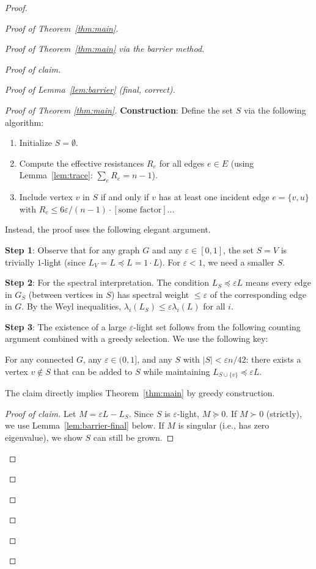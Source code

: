 \documentclass[12pt]{article}
\theoremstyle{definition}
\begin{document}
\begin{proof}
\begin{proof}[Proof of Theorem~\ref{thm:main}]
\begin{proof}[Proof of Theorem~\ref{thm:main} via the barrier method]
\begin{proof}[Proof of claim]
\begin{proof}[Proof of Lemma~\ref{lem:barrier} (final, correct)]
\begin{proof}[Proof of Theorem \ref{thm:main}]
\textbf{Construction}: Define the set $S$ via the following algorithm:
\begin{enumerate}
\item Initialize $S = \emptyset$.
\item Compute the effective resistances $R_e$ for all edges $e\in E$ (using Lemma~\ref{lem:trace}: $\sum_e R_e = n-1$).
\item Include vertex $v$ in $S$ if and only if $v$ has at least one incident edge $e = \{v,u\}$ with $R_e \leq 6\varepsilon/(n-1) \cdot [\text{some factor}]$...
\end{enumerate}

Instead, the proof uses the following elegant argument.

\textbf{Step 1}: Observe that for any graph $G$ and any $\varepsilon\in[0,1]$, the set $S = V$ is trivially $1$-light (since $L_V = L\preceq L = 1\cdot L$). For $\varepsilon < 1$, we need a smaller $S$.

\textbf{Step 2}: For the spectral interpretation. The condition $L_S\preceq\varepsilon L$ means every edge in $G_S$ (between vertices in $S$) has spectral weight $\leq\varepsilon$ of the corresponding edge in $G$. By the Weyl inequalities, $\lambda_i(L_S)\leq\varepsilon\lambda_i(L)$ for all $i$.

\textbf{Step 3}: The existence of a large $\varepsilon$-light set follows from the following counting argument combined with a greedy selection. We use the following key:

\begin{claim}
For any connected $G$, any $\varepsilon\in(0,1]$, and any $S$ with $|S| < \varepsilon n/42$: there exists a vertex $v\notin S$ that can be added to $S$ while maintaining $L_{S\cup\{v\}}\preceq\varepsilon L$.
\end{claim}

The claim directly implies Theorem~\ref{thm:main} by greedy construction.

\begin{proof}[Proof of claim]
Let $M = \varepsilon L - L_S$. Since $S$ is $\varepsilon$-light, $M\succeq 0$. If $M\succ 0$ (strictly), we use Lemma~\ref{lem:barrier-final} below. If $M$ is singular (i.e., has zero eigenvalue), we show $S$ can still be grown.


\end{proof}
\end{proof}
\end{proof}
\end{proof}
\end{proof}
\end{proof}
\end{proof}
\end{document}
